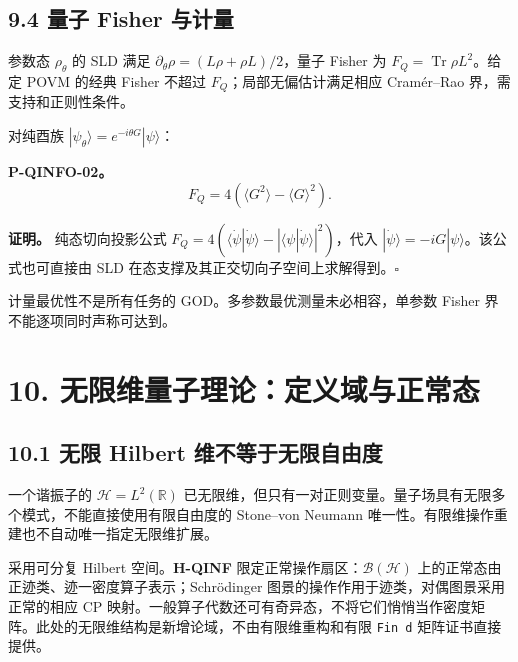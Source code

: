 \documentclass[
  11pt,
  oneside]{book}
\begin{document}
\hypertarget{ux91cfux5b50-fisher-ux4e0eux8ba1ux91cf}{%
\section{9.4 量子 Fisher
与计量}\label{ux91cfux5b50-fisher-ux4e0eux8ba1ux91cf}}

参数态 \(\rho_\theta\) 的 SLD 满足
\(\partial_\theta\rho=(L\rho+\rho L)/2\)，量子 Fisher 为
\(F_Q=\operatorname{Tr}\rho L^2\)。给定 POVM 的经典 Fisher 不超过
\(F_Q\)；局部无偏估计满足相应 Cramér--Rao 界，需支持和正则性条件。

对纯酉族 \(|\psi_\theta\rangle=e^{-i\theta G}|\psi\rangle\)：

\protect\hypertarget{p-qinfo-02}{}{}

\textbf{P-QINFO-02。} \[
F_Q=4(\langle G^2\rangle-\langle G\rangle^2).
\]

\textbf{证明。} 纯态切向投影公式
\(F_Q=4(\langle\dot\psi|\dot\psi\rangle- |\langle\psi|\dot\psi\rangle|^2)\)，代入
\(|\dot\psi\rangle=-iG|\psi\rangle\)。该公式也可直接由 SLD
在态支撑及其正交切向子空间上求解得到。\(\square\)

计量最优性不是所有任务的 GOD。多参数最优测量未必相容，单参数 Fisher
界不能逐项同时声称可达到。

\hypertarget{ch-10}{%
\chapter{10. 无限维量子理论：定义域与正常态}\label{ch-10}}

\hypertarget{ux65e0ux9650-hilbert-ux7ef4ux4e0dux7b49ux4e8eux65e0ux9650ux81eaux7531ux5ea6}{%
\section{10.1 无限 Hilbert
维不等于无限自由度}\label{ux65e0ux9650-hilbert-ux7ef4ux4e0dux7b49ux4e8eux65e0ux9650ux81eaux7531ux5ea6}}

一个谐振子的 \(\mathcal H=L^2(\mathbb R)\)
已无限维，但只有一对正则变量。量子场具有无限多个模式，不能直接使用有限自由度的
Stone--von Neumann 唯一性。有限维操作重建也不自动唯一指定无限维扩展。

采用可分复 Hilbert 空间。\textbf{H-QINF}
限定正常操作扇区：\(\mathcal B(\mathcal H)\)
上的正常态由正迹类、迹一密度算子表示；Schrödinger
图景的操作作用于迹类，对偶图景采用正常的相应 CP
映射。一般算子代数还可有奇异态，不将它们悄悄当作密度矩阵。此处的无限维结构是新增论域，不由有限维重构和有限
\texttt{Fin\ d} 矩阵证书直接提供。
\end{document}
